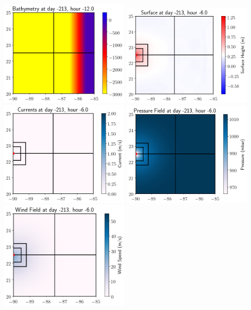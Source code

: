 \documentclass[11pt]{article}
\begin{document}
\vskip 10pt 
\includegraphics[width=0.475\textwidth]{frame0000fig301.png}
\vskip 10pt 
\includegraphics[width=0.475\textwidth]{frame0001fig0.png}
\includegraphics[width=0.475\textwidth]{frame0001fig1.png}
\vskip 10pt 
\includegraphics[width=0.475\textwidth]{frame0001fig2.png}
\includegraphics[width=0.475\textwidth]{frame0001fig4.png}
\end{document}
